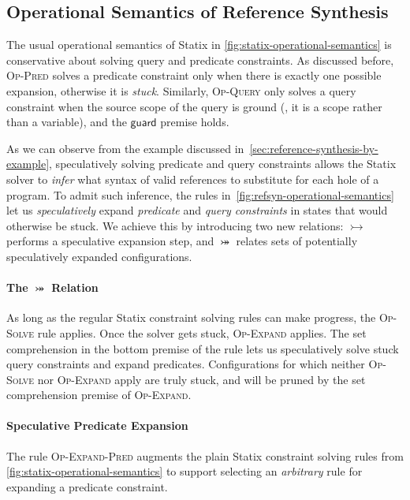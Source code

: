 \vspace{1em}
\subsection{Operational Semantics of Reference Synthesis}%
\label{subsec:refsyn-operational-semantics}

The usual operational semantics of Statix in \cref{fig:statix-operational-semantics} is conservative about solving query and predicate constraints.
As discussed before, \textsc{Op-Pred} solves a predicate constraint only when there is exactly one possible expansion, otherwise it is \emph{stuck}.
Similarly, \textsc{Op-Query} only solves a query constraint when the source scope of the query is ground (\ie, it is a scope rather than a variable), and the $\mathsf{guard}$ premise holds.

As we can observe from the example discussed in~\cref{sec:reference-synthesis-by-example}, speculatively solving predicate and query constraints allows the Statix solver to \emph{infer} what syntax of valid references to substitute for each hole of a program.
To admit such inference, the rules in~\cref{fig:refsyn-operational-semantics} let us \emph{speculatively} expand \emph{predicate} and \emph{query constraints} in states that would otherwise be stuck.
We achieve this by introducing two new relations: $\rightarrowtail$ performs a speculative expansion step, and $\twoheadrightarrowtail$ relates sets of potentially speculatively expanded configurations.


\paragraph{The $\twoheadrightarrowtail$ Relation}
As long as the regular Statix constraint solving rules can make progress, the \textsc{Op-Solve} rule applies.
Once the solver gets stuck, \textsc{Op-Expand} applies.
The set comprehension in the bottom premise of the rule lets us speculatively solve stuck query constraints and expand predicates.
Configurations for which neither \textsc{Op-Solve} nor \textsc{Op-Expand} apply are truly stuck, and will be pruned by the set comprehension premise of \textsc{Op-Expand}.


\paragraph{Speculative Predicate Expansion}
The rule \textsc{Op-Expand-Pred} augments the plain Statix constraint solving rules from \cref{fig:statix-operational-semantics} to support selecting an \emph{arbitrary} rule for expanding a predicate constraint.


